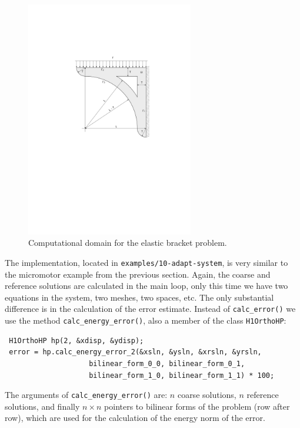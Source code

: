 \begin{figure}[ht]
  \medskip \centering
  \includegraphics[width=0.65\textwidth]{img/bracket}
  \vspace{-2mm}
  \caption{Computational domain for the elastic bracket problem.}
  \label{fig:bracket}
\end{figure}

The implementation, located in {\tt examples/10-adapt-system}, is very similar to the micromotor
example from the previous section. Again, the coarse and reference solutions are calculated
in the main loop, only this time we have two equations in the system, two meshes, two spaces, etc.
The only substantial difference is in the calculation of the error estimate. Instead of 
\verb"calc_error()" we use the method \verb"calc_energy_error()", also a member of the 
class \verb"H1OrthoHP":

\begin{lstlisting}
 H1OrthoHP hp(2, &xdisp, &ydisp);
 error = hp.calc_energy_error_2(&xsln, &ysln, &xrsln, &yrsln, 
                    bilinear_form_0_0, bilinear_form_0_1,
                    bilinear_form_1_0, bilinear_form_1_1) * 100;
\end{lstlisting}

The arguments of \verb"calc_energy_error()" are: $n$ coarse solutions, $n$ reference solutions, 
and finally $n \times n$ pointers to bilinear forms of the problem (row after row), which are used 
for the calculation of the energy norm of the error.

